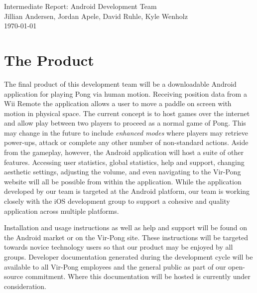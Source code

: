 \documentclass[12pt]{article}
\begin{document}
 \begin{titlepage}
    \vspace*{\fill}
    \begin{center}
      {\Huge Intermediate Report: Android Development Team}\\[0.5cm]
      {\Large Jillian Andersen, Jordan Apele, David Ruhle, Kyle Wenholz}\\[0.4cm]
      \today
    \end{center}
    \vspace*{\fill}
  \end{titlepage}
  
\tableofcontents
\newpage


\section{The Product}
The final product of this development team will be a downloadable Android application for playing Pong via human motion.  Receiving position data from a Wii Remote the application allows a user to move a paddle on screen with motion in physical space.  The current concept is to host games over the internet and allow play between two players to proceed as a normal game of Pong.  This may change in the future to include \textit{enhanced modes} where players may retrieve power-ups, attack or complete any other number of non-standard actions.  Aside from the gameplay, however, the Android application will host a suite of other features.  Accessing user statistics, global statistics, help and support, changing aesthetic settings, adjusting the volume, and even navigating to the Vir-Pong website will all be possible from within the application.  While the application developed by our team is targeted at the Android platform, our team is working closely with the iOS development group to support a cohesive and quality application across multiple platforms.  

Installation and usage instructions as well as help and support will be found on the Android market or on the Vir-Pong site.  These instructions will be targeted towards novice technology users so that our product may be enjoyed by all groups.  Developer documentation generated during the development cycle will be available to all Vir-Pong employees and the general public as part of our open-source commitment.  Where this documentation will be hosted is currently under consideration.  
\end{document}
